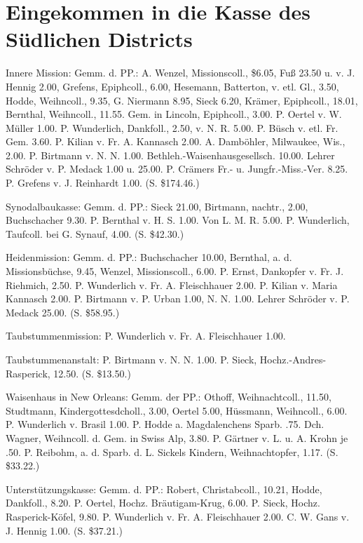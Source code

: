 \chapter[Eingekommen in die Kasse des Südlichen Districts]{Eingekommen in die Kasse des Südlichen Districts}

Innere Mission: Gemm. d. PP.: A. Wenzel, Missionscoll., \$6.05, Fuß 23.50 u. v. J. Hennig 2.00, Grefens, Epiphcoll., 6.00, Hesemann, Batterton, v. etl. Gl., 3.50, Hodde, Weihncoll., 9.35, G. Niermann 8.95, Sieck 6.20, Krämer, Epiphcoll., 18.01, Bernthal, Weihncoll., 11.55. Gem. in Lincoln, Epiphcoll., 3.00. P. Oertel v. W. Müller 1.00. P. Wunderlich, Dankfoll., 2.50, v. N. R. 5.00. P. Büsch v. etl. Fr. Gem. 3.60. P. Kilian v. Fr. A. Kannasch 2.00. A. Damböhler, Milwaukee, Wis., 2.00. P. Birtmann v. N. N. 1.00. Bethleh.-Waisenhausgesellsch. 10.00. Lehrer Schröder v. P. Medack 1.00 u. 25.00. P. Crämers Fr.- u. Jungfr.-Miss.-Ver. 8.25. P. Grefens v. J. Reinhardt 1.00. (S. \$174.46.)

Synodalbaukasse: Gemm. d. PP.: Sieck 21.00, Birtmann, nachtr., 2.00, Buchschacher 9.30. P. Bernthal v. H. S. 1.00. Von L. M. R. 5.00. P. Wunderlich, Taufcoll. bei G. Synauf, 4.00. (S. \$42.30.)

Heidenmission: Gemm. d. PP.: Buchschacher 10.00, Bernthal, a. d. Missionsbüchse, 9.45, Wenzel, Missionscoll., 6.00. P. Ernst, Dankopfer v. Fr. J. Riehmich, 2.50. P. Wunderlich v. Fr. A. Fleischhauer 2.00. P. Kilian v. Maria Kannasch 2.00. P. Birtmann v. P. Urban 1.00, N. N. 1.00. Lehrer Schröder v. P. Medack 25.00. (S. \$58.95.)

Taubstummenmission: P. Wunderlich v. Fr. A. Fleischhauer 1.00.

Taubstummenanstalt: P. Birtmann v. N. N. 1.00. P. Sieck, Hochz.-Andres-Rasperick, 12.50. (S. \$13.50.)

Waisenhaus in New Orleans: Gemm. der PP.: Othoff, Weihnachtcoll., 11.50, Studtmann, Kindergottesdcholl., 3.00, Oertel 5.00, Hüssmann, Weihncoll., 6.00. P. Wunderlich v. Brasil 1.00. P. Hodde a. Magdalenchens Sparb. .75. Dch. Wagner, Weihncoll. d. Gem. in Swiss Alp, 3.80. P. Gärtner v. L. u. A. Krohn je .50. P. Reibohm, a. d. Sparb. d. L. Sickels Kindern, Weihnachtopfer, 1.17. (S. \$33.22.)

Unterstützungskasse: Gemm. d. PP.: Robert, Christabcoll., 10.21, Hodde, Dankfoll., 8.20. P. Oertel, Hochz. Bräutigam-Krug, 6.00. P. Sieck, Hochz. Rasperick-Köfel, 9.80. P. Wunderlich v. Fr. A. Fleischhauer 2.00. C. W. Gans v. J. Hennig 1.00. (S. \$37.21.)


